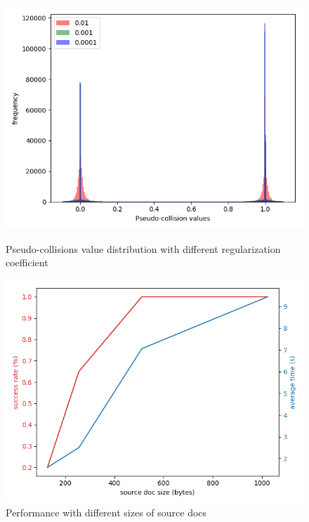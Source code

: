 \documentclass{article}
\begin{document}
\begin{figure}[t]
    \centering
    \begin{minipage}{.45\textwidth}
        \centering
        \includegraphics[width=\textwidth]{data_distribution}
        \caption{Pseudo-collisions value distribution with different regularization coefficient} 
        \label{fig:datadist}
    \end{minipage}%
    \hfill
    \begin{minipage}{.45\textwidth}
        \centering
        \includegraphics[width=\textwidth]{source_doc_size}
        \caption{Performance with different sizes of source docs}
        \label{fig:docsize}
    \end{minipage}
\end{figure}
\end{document}
